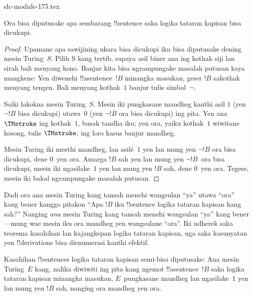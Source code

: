 \begin{filecontents*}[overwrite]{slc-module-175.tex}
\begin{cor}%
Ora bisa diputusake apa sembarang !!{sentence}
saka logika tataran kapisan bisa dicukupi.
\end{cor}

\begin{proof}
  Upamane apa sawijining ukara bisa dicukupi iku bisa diputusake
  dening mesin Turing~$S$. Pilih S kang tertib, supaya asil biner ana ing kothak siji lan sirah bali menyang kono. Banjur kita bisa ngrampungake
  masalah putusan kaya mangkene: Yen diwenehi
  !!a{sentence}~$!B$ minangka masukan, geser $!B$
  sakothak menyang tengen. Bali menyang kothak~$1$
  banjur tulis simbol~$\lnot$.

  Saiki lakokna mesin Turing~$S$. Mesin iki pungkasane mandheg
  kanthi asil $1$ (yen $\lnot !B$ bisa dicukupi) utawa~$0$
  (yen $\lnot !B$ ora bisa dicukupi) ing pita. Yen ana
  $\TMstroke$ ing kothak~$1$, busak tandha iku;
  yen ora, yaiku kothak~$1$ wiwitane kosong, tulis $\TMstroke$;
  ing loro kasus banjur mandheg.

  Mesin Turing iki mesthi mandheg, lan asilé~$1$ yen lan
  mung yen $\lnot !B$ ora bisa dicukupi, dene $0$~yen ora.
  Amarga $!B$ sah yen lan mung yen $\lnot !B$~ora bisa
  dicukupi, mesin iki ngasilake~$1$ yen lan mung yen
  $!B$ sah, dene $0$~yen ora. Tegese, mesin iki bakal
  ngrampungake masalah putusan.
\end{proof}

\begin{explain}
Dadi ora ana mesin Turing kang tansah menehi wangsulan
``ya'' utawa ``ora'' kang bener kanggo pitakon
``Apa $!B$ iku !!{sentence} logika tataran kapisan kang sah?''
Nanging \emph{ana} mesin Turing kang tansah menehi
wangsulan ``ya'' kang bener---mung wae mesin iku ora
mandheg yen wangsulane ``ora''. Iki ndherek saka
teorema kasahihan lan kajangkepan logika tataran kapisan,
uga saka kasunyatan yen !!{derivation}s bisa
dienumerasi kanthi efektif.
\end{explain}

\begin{thm}
  Kasahihan !!{sentence}s logika tataran kapisan semi-bisa
  diputusake: Ana mesin Turing~$E$ kang, nalika diwiwiti
  ing pita kang ngemot !!a{sentence}~$!B$ saka logika
  tataran kapisan minangka masukan, $E$~pungkasane mandheg lan
  ngasilake~$1$ yen lan mung yen $!B$ sah, nanging ora
  mandheg yen ora.
\end{thm}


\end{filecontents*}
